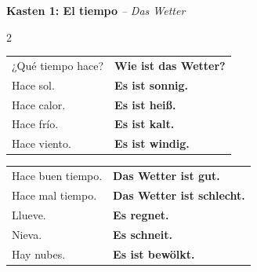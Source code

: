 \documentclass[10pt, a4paper]{article}
\newcommand{\sanstext}[1]{{\fontfamily{phv}\selectfont #1}}
\newcommand{\thema}{El tiempo y los lugares}
\newcommand{\klasse}{8}
\newcommand{\de}[1]{{\small\textit{\textcolor{mittelgrau}{#1}}}}
\newcommand{\lsg}[1]{\textcolor{loesung}{\textbf{#1}}}
\begin{document}

\noindent
{}

\vspace{0.5cm}


\begin{vokabelkasten}
\textbf{Kasten 1: El tiempo} \de{-- Das Wetter}

\vspace{6pt}

\begin{multicols}{2}
\begin{tabular}{@{}p{4cm}p{4cm}@{}}
¿Qué tiempo hace? & \lsg{Wie ist das Wetter?} \\[0.6em]
Hace sol. & \lsg{Es ist sonnig.} \\[0.6em]
Hace calor. & \lsg{Es ist heiß.} \\[0.6em]
Hace frío. & \lsg{Es ist kalt.} \\[0.6em]
Hace viento. & \lsg{Es ist windig.} \\
\end{tabular}

\columnbreak

\begin{tabular}{@{}p{4cm}p{4cm}@{}}
Hace buen tiempo. & \lsg{Das Wetter ist gut.} \\[0.6em]
Hace mal tiempo. & \lsg{Das Wetter ist schlecht.} \\[0.6em]
Llueve. & \lsg{Es regnet.} \\[0.6em]
Nieva. & \lsg{Es schneit.} \\[0.6em]
Hay nubes. & \lsg{Es ist bewölkt.} \\
\end{tabular}
\end{multicols}
\end{vokabelkasten}
\end{document}
